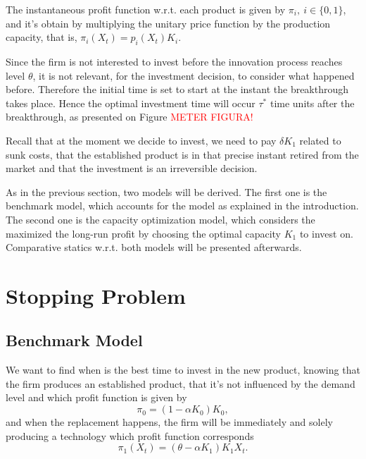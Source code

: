 The instantaneous profit function w.r.t. each product is given by $\pi_i, \ i \in \{0,1\}$, and it's obtain by multiplying the unitary price function by the production capacity, that is, $\pi_i(X_t)=p_i(X_t) K_i$.

Since the firm is not interested to invest before the innovation process reaches level $\theta$, it is not relevant, for the investment decision, to consider what happened before. Therefore the initial time is set to start at the instant the breakthrough takes place. %
Hence the optimal investment time will occur $\tau^*$ time units after the breakthrough, as presented on Figure \textcolor{red}{METER FIGURA!}  %

Recall that at the moment we decide to invest, we need to pay $\delta K_1$ related to sunk costs, that the established product is in that precise instant retired from the market and that the investment is an irreversible decision.



As in the previous section, two models will be derived. The first one is the benchmark model, which accounts for the model as explained in the introduction. The second one is the capacity optimization model, which considers the maximized the long-run profit by choosing the optimal capacity $K_1$ to invest on. Comparative statics w.r.t. both models will be presented afterwards.



\section{Stopping Problem}
\label{section:2_theory}



\subsection{Benchmark Model}
\label{subsec:2_bm}

We want to find when is the best time to invest in the new product, knowing that the firm produces an established product, that it's not influenced by the demand level and which profit function is given by 
\begin{equation}
\pi_0=(1-\alpha K_0)K_0,
\label{pi0}
\end{equation}
and when the replacement happens, the firm will be immediately and solely producing a technology which profit function corresponds
\begin{equation}
\pi_1(X_t) =(\theta-\alpha K_1)K_1 X_t.
\label{pi1}
\end{equation}

